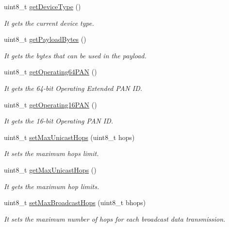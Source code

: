 \begin{DoxyCompactItemize}
uint8\+\_\+t \hyperlink{class_wasp_x_bee_z_b_a072e4a6df44fc8521e6bbfb52bce446a}{get\+Device\+Type} ()
\begin{DoxyCompactList}\small\item\em It gets the current device type. \end{DoxyCompactList}\item 
uint8\+\_\+t \hyperlink{class_wasp_x_bee_z_b_a73bbe4ac7a2b5bbbff43005aefc9d4d3}{get\+Payload\+Bytes} ()
\begin{DoxyCompactList}\small\item\em It gets the bytes that can be used in the payload. \end{DoxyCompactList}\item 
uint8\+\_\+t \hyperlink{class_wasp_x_bee_z_b_a55dfaebfc32020a28080c33f7d10a12a}{get\+Operating64\+P\+AN} ()
\begin{DoxyCompactList}\small\item\em It gets the 64-\/bit Operating Extended P\+AN ID. \end{DoxyCompactList}\item 
uint8\+\_\+t \hyperlink{class_wasp_x_bee_z_b_ac4ec46ef3f4cb180e77bd2460d9aee1b}{get\+Operating16\+P\+AN} ()
\begin{DoxyCompactList}\small\item\em It gets the 16-\/bit Operating P\+AN ID. \end{DoxyCompactList}\item 
uint8\+\_\+t \hyperlink{class_wasp_x_bee_z_b_a3479c73cb6688e6527c8e6b34e9d260b}{set\+Max\+Unicast\+Hops} (uint8\+\_\+t hops)
\begin{DoxyCompactList}\small\item\em It sets the maximum hops limit. \end{DoxyCompactList}\item 
uint8\+\_\+t \hyperlink{class_wasp_x_bee_z_b_a6a4ba0967cccf61e5a5e2ab30c7bb2c1}{get\+Max\+Unicast\+Hops} ()
\begin{DoxyCompactList}\small\item\em It gets the maximum hop limits. \end{DoxyCompactList}\item 
uint8\+\_\+t \hyperlink{class_wasp_x_bee_z_b_a56b5daef58984a91e299825bc6199439}{set\+Max\+Broadcast\+Hops} (uint8\+\_\+t bhops)
\begin{DoxyCompactList}\small\item\em It sets the maximum number of hops for each broadcast data transmission. \end{DoxyCompactList}\item 

\end{DoxyCompactItemize}
